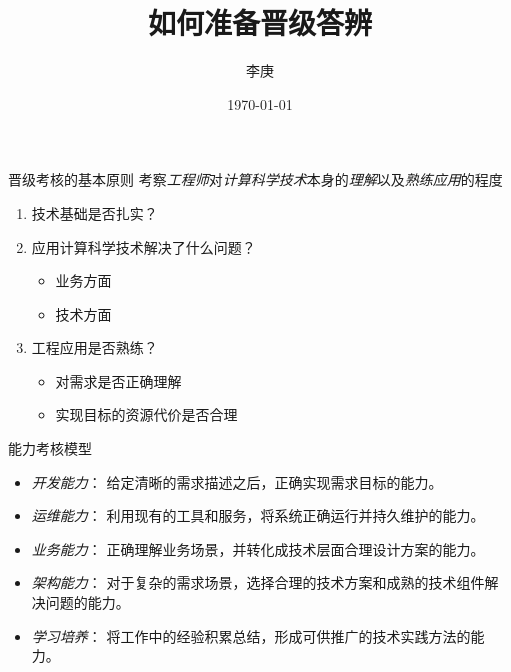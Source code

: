 \documentclass[handout]{beamer}
\begin{document}
\begin{CJK}{UTF8}{gbsn}

\title{如何准备晋级答辨}


\author{李庚}


\date{\today}

\begin{frame}
  \titlepage
\end{frame}

\begin{frame}{晋级考核的基本原则}
  考察\emph{工程师}对\emph{计算科学技术}本身的\emph{理解}以及\emph{熟练应用}的程度
  \begin{enumerate}
  \item <2-> {
    技术基础是否扎实？
  }
  \item <3-> {
    应用计算科学技术解决了什么问题？
    \begin{itemize}
    \item 业务方面
    \item 技术方面
    \end{itemize}
  }
  \item <4-> {
    工程应用是否熟练？
    \begin{itemize}
    \item 对需求是否正确理解
    \item 实现目标的资源代价是否合理
    \end{itemize}
  }
  \end{enumerate}
\end{frame}

\begin{frame}{能力考核模型}
  \begin{itemize}
  \item  {
    \emph{开发能力}： { 给定清晰的需求描述之后，正确实现需求目标的能力。}
  }
  \item  {
    \emph{运维能力}： { 利用现有的工具和服务，将系统正确运行并持久维护的能力。}
  }
  \item  {
    \emph{业务能力}： { 正确理解业务场景，并转化成技术层面合理设计方案的能力。}
  }
  \item  {
    \emph{架构能力}： { 对于复杂的需求场景，选择合理的技术方案和成熟的技术组件解决问题的能力。}
  }
  \item  {
    \emph{学习培养}： { 将工作中的经验积累总结，形成可供推广的技术实践方法的能力。 }
  }
  \end{itemize}
\end{frame}



\end{CJK}
\end{document}
